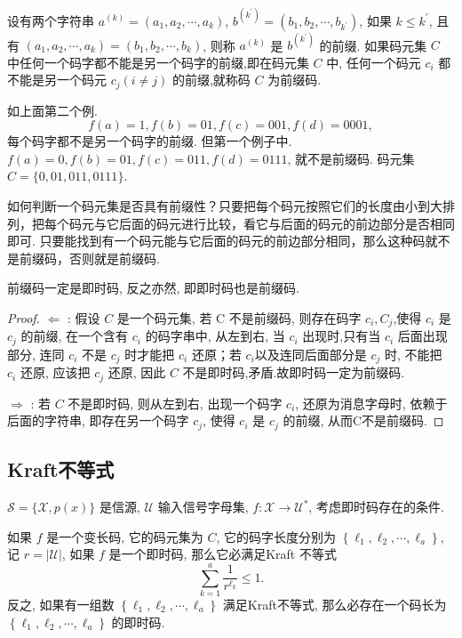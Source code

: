 \begin{definition}[前缀码]
设有两个字符串 $ a^{(k)}=\left(a_{1}, a_{2}, \cdots, a_{k}\right) $, $ b^{\left(k^{\prime}\right)}=\left(b_{1}, b_{2}, \cdots, b_{k^{\prime}}\right) $, 如果 $ k \leq k^{\prime} $, 且有 $ \left(a_{1}, a_{2}, \cdots, a_{k}\right)=\left(b_{1}, b_{2}, \cdots, b_{k}\right) $, 则称 $ a^{(k)} $ 是 $ b^{\left(k^{\prime}\right)} $ 的前缀. 如果码元集 $ C $ 中任何一个码字都不能是另一个码字的前缀,即在码元集 $ C $ 中, 任何一个码元 $ c_{i} $ 都不能是另一个码元 $ c_{j}(i \neq j) $ 的前缀,就称码 $ C $ 为前缀码.
\end{definition}

如上面第二个例.
$$
f(a)=1, f(b)=01, f(c)=001, f(d)=0001,
$$
每个码字都不是另一个码字的前缀.
但第一个例子中. $ f(a)=0, f(b)=01, f(c)=011, f(d)=0111 $, 就不是前缀码. 码元集 $ C=\{0,01,  011,0111\} $.

如何判断一个码元集是否具有前缀性？只要把每个码元按照它们的长度由小到大排列，把每个码元与它后面的码元进行比较，看它与后面的码元的前边部分是否相同即可. 只要能找到有一个码元能与它后面的码元的前边部分相同，那么这种码就不是前缀码，否则就是前缀码. 
\begin{theorem}[即时码与前缀码的关系]
    前缀码一定是即时码, 反之亦然, 即即时码也是前缀码.
\end{theorem}
\begin{proof}
 $ \Leftarrow $ : 假设 $ C $ 是一个码元集, 若 $ \mathrm{C} $ 不是前缀码, 则存在码字 $ c_{i}, C_{j} $,使得 $ c_{i} $ 是 $ c_{j} $ 的前缀, 在一个含有 $ c_{i} $ 的码字串中, 从左到右, 当 $ c_{i} $ 出现时,只有当 $ c_{i} $ 后面出现部分, 连同 $ c_{i} $ 不是 $ c_{j} $ 时才能把 $ c_{i} $ 还原；若 $ c_{i} $以及连同后面部分是 $ c_{j} $ 时, 不能把 $ c_{i} $ 还原, 应该把 $ c_{j} $ 还原, 因此 $ C $ 不是即时码,矛盾.故即时码一定为前缀码.
 
$ \Rightarrow $ : 若 $ C $ 不是即时码, 则从左到右, 出现一个码字 $ c_{i} $, 还原为消息字母时, 依赖于后面的字符串, 即存在另一个码字 $ c_{j} $, 使得 $ c_{i} $ 是 $ c_{j} $ 的前缀, 从而C不是前缀码.
\end{proof}

\subsection{Kraft不等式}

$ \mathscr{S}=\{\mathscr{X}, p(x)\} $ 是信源, $ \mathscr{U} $ 输入信号字母集, $ f: \mathscr{X} \rightarrow \mathscr{U}^{*} $, 考虑即时码存在的条件.

\begin{theorem}[Kraft不等式]
    如果 $ f $ 是一个变长码, 它的码元集为 $ C $, 它的码字长度分别为 $ \left\{\ell_{1}, \ell_{2}, \cdots, \ell_{a}\right\} $, 记 $ r=|\mathscr{U}| $, 如果 $ f $ 是一个即时码, 那么它必满足Kraft 不等式
$$
\sum_{k=1}^{a} \frac{1}{r^{\ell_{k}}} \leq 1 .
$$
反之, 如果有一组数 $ \left\{\ell_{1}, \ell_{2}, \cdots, \ell_{a}\right\} $ 满足Kraft不等式, 那么必存在一个码长为 $ \left\{\ell_{1}, \ell_{2}, \cdots, \ell_{a}\right\} $ 的即时码.
\end{theorem}

